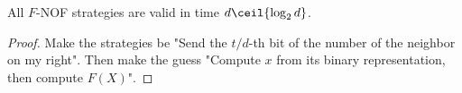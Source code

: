 \begin{lemma}
  \label{lem:eventually-valid-strategy}

  All $F$-NOF strategies are valid in time $d\ceil{\log_2 d}$.
\end{lemma}
\begin{proof}

  Make the strategies be "Send the $t / d$-th bit of the number of the neighbor on my right". Then make the guess "Compute $x$ from its binary representation, then compute $F(X)$".
\end{proof}
